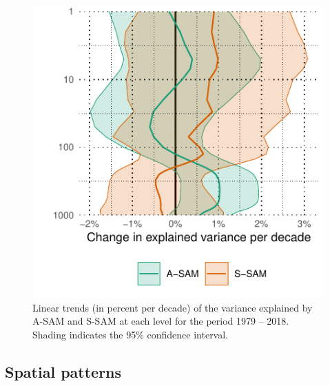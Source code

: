 \documentclass[smallextended]{svjour3}       %
\begin{document}
\begin{figure}
\includegraphics{r-squared-trend-1} \caption{Linear trends (in percent per decade) of the variance explained by A\nobreakdash-SAM and S\nobreakdash-SAM at each level for the period 1979 -- 2018. Shading indicates the 95\% confidence interval.}\label{fig:r-squared-trend}
\end{figure}

\hypertarget{spatial}{%
\subsection{Spatial patterns}\label{spatial}}
\end{document}

